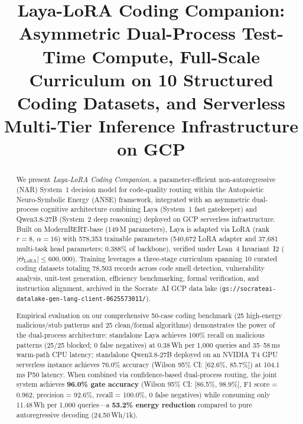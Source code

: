\documentclass[conference]{IEEEtran}
\begin{document}
\title{Laya-LoRA Coding Companion: Asymmetric Dual-Process Test-Time Compute, Full-Scale Curriculum on 10 Structured Coding Datasets, and Serverless Multi-Tier Inference Infrastructure on GCP}

\author{
}

\maketitle

\begin{abstract}
We present \emph{Laya-LoRA Coding Companion}, a parameter-efficient non-autoregressive (NAR)
System~1 decision model for code-quality routing within the Autopoietic Neuro-Symbolic Energy
(ANSE) framework, integrated with an asymmetric dual-process cognitive architecture combining
Laya (System~1 fast gatekeeper) and Qwen3.8-27B (System~2 deep reasoning) deployed on GCP serverless
infrastructure. Built on ModernBERT-base (149\,M parameters), Laya is adapted via LoRA
(rank~$r{=}8$, $\alpha{=}16$) with 578{,}353 trainable parameters (540{,}672 LoRA adapter and 37{,}681 multi-task head parameters; 0.388\% of backbone), verified under
Lean~4 Invariant~I2 ($|\Theta_\text{LoRA}| \leq 600{,}000$). Training leverages a three-stage curriculum
spanning 10 curated coding datasets totaling 78{,}503 records across code smell detection, vulnerability
analysis, unit-test generation, efficiency benchmarking, formal verification, and instruction alignment,
archived in the Socrate~AI GCP data lake (\texttt{gs://socrateai-datalake-gen-lang-client-0625573011/}).

Empirical evaluation on our comprehensive 50-case coding benchmark (25 high-energy malicious/stub patterns
and 25 clean/formal algorithms) demonstrates the power of the dual-process architecture:
standalone Laya achieves 100\% recall on malicious patterns (25/25 blocked; 0 false negatives) at 0.38\,Wh
per 1{,}000 queries and 35--58\,ms warm-path CPU latency; standalone Qwen3.8-27B deployed on an NVIDIA T4 GPU
serverless instance achieves 76.0\% accuracy (Wilson 95\% CI: [62.6\%, 85.7\%]) at 104.1\,ms P50 latency.
When combined via confidence-based dual-process routing, the joint system achieves \textbf{96.0\% gate accuracy}
(Wilson 95\% CI: [86.5\%, 98.9\%], F1 score = 0.962, precision = 92.6\%, recall = 100.0\%, 0 false negatives)
while consuming only 11.48\,Wh per 1{,}000 queries---a \textbf{53.2\% energy reduction} compared to pure autoregressive decoding (24.50\,Wh/1k).


\end{abstract}
\end{document}
